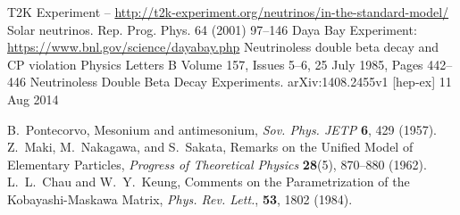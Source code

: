 \documentclass[aps,prd,twocolumn,nofootinbib]{revtex4-1}
\begin{document}
\begin{thebibliography}{9}
  T2K Experiment -- \url{http://t2k-experiment.org/neutrinos/in-the-standard-model/}
Solar neutrinos. Rep. Prog. Phys. 64 (2001) 97–146
Daya Bay Experiment: \url{https://www.bnl.gov/science/dayabay.php}
Neutrinoless double beta decay and CP violation Physics Letters B Volume 157, Issues 5–6, 25 July 1985, Pages 442–446
Neutrinoless Double Beta Decay Experiments. arXiv:1408.2455v1 [hep-ex] 11 Aug 2014

  B.~Pontecorvo,
  Mesonium and antimesonium,
  \emph{Sov. Phys. JETP} {\bf 6}, 429 (1957).
  Z.~Maki, M.~Nakagawa, and S.~Sakata,
  Remarks on the Unified Model of Elementary Particles,
  \emph{Progress of Theoretical Physics} {\bf 28}(5), 870–880 (1962).
  L.~L.~Chau and W.~Y.~Keung,
  Comments on the Parametrization of the Kobayashi-Maskawa Matrix,
  \emph{Phys. Rev. Lett.}, {\bf 53}, 1802 (1984).


\end{thebibliography}
\end{document}
